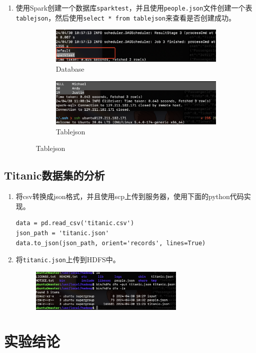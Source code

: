 \documentclass{article}
\begin{document}
\begin{enumerate}
\begin{figure}[H]
    \end{figure}
    \item 使用Spark创建一个数据库\texttt{sparktest}，并且使用\texttt{people.json}文件创建一个表
    \texttt{tablejson}，然后使用\texttt{select * from tablejson}来查看是否创建成功。
    \begin{figure}[H]
        \begin{subfigure}{0.5\textwidth}
            \centering
            \includegraphics[width=\textwidth]{databases.png}
            \caption*{Database}
        \end{subfigure}
        \hfill
        \begin{subfigure}{0.45\textwidth}
            \centering
            \includegraphics[width=\textwidth]{table.png}
            \caption*{Tablejson}
        \end{subfigure}
    \end{figure}
\end{enumerate}
\subsection{Titanic数据集的分析}
\begin{enumerate}
    \item 将csv转换成json格式，并且使用scp上传到服务器，使用下面的python代码实现。
    \begin{lstlisting}[style=pythonstyle]
data = pd.read_csv('titanic.csv')
json_path = 'titanic.json'
data.to_json(json_path, orient='records', lines=True)
    \end{lstlisting}
    \item 将\texttt{titanic.json}上传到HDFS中。
    \begin{figure}
        \centering
        \includegraphics[width=0.7\textwidth]{uploadtitanic.png}
    \end{figure}
\end{enumerate}
\section{实验结论}
\end{document}
